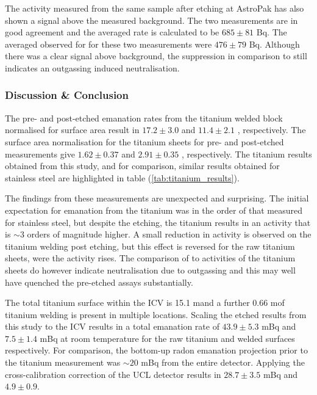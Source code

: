 The \PoTOF{} activity measured from the same sample after etching at AstroPak has also shown a signal above the measured background. The two measurements are in good agreement and the averaged rate is calculated to be $685\pm81$ \micro{}Bq. The averaged observed for \PoTOE{} for these two measurements were $476\pm79$ \micro{}Bq. Although there was a clear signal above background, the suppression in comparison to \PoTOF{} still indicates an outgassing induced neutralisation. 

\subsubsection{Discussion \& Conclusion}

The pre- and post-etched emanation rates from the titanium welded block normalised for surface area result in $17.2\pm3.0$ \mBqms and $11.4\pm2.1$ \mBqms, respectively. The surface area normalisation for the titanium sheets for pre- and post-etched measurements give $1.62\pm0.37$ \mBqms and $2.91\pm0.35$ \mBqms, respectively. The titanium results obtained from this study, and for comparison, similar results obtained for stainless steel are highlighted in table (\ref{tab:titanium_results}).

The findings from these measurements are unexpected and surprising. The initial expectation for emanation from the titanium was in the order of that measured for stainless steel, but despite the etching, the titanium results in an activity that is $\sim3$ orders of magnitude higher. A small reduction in activity is observed on the titanium welding post etching, but this effect is reversed for the raw titanium sheets, were the activity rises. The comparison of \PoTOF{} to \PoTOE{} activities of the titanium sheets do however indicate neutralisation due to outgassing and this may well have quenched the pre-etched assays substantially.  

The total titanium surface within the ICV is 15.1 m\squared and a further 0.66 m\squared of titanium welding is present in multiple locations. Scaling the etched results from this study to the ICV results in a total emanation rate of $43.9\pm5.3$ mBq and $7.5\pm1.4$ mBq at room temperature for the raw titanium and welded surfaces respectively. For comparison, the bottom-up radon emanation projection prior to the titanium measurement was $\sim20$ mBq from the entire detector. Applying the cross-calibration correction of the UCL detector results in $28.7\pm3.5$ mBq and $4.9\pm0.9$.
%

%


